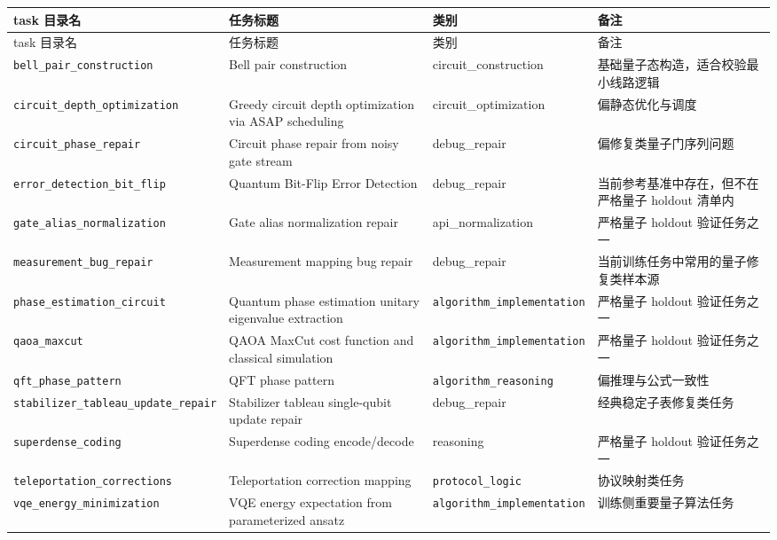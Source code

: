 \documentclass[11pt,a4paper]{article}
\newcommand{\code}[1]{\begingroup\ttfamily\footnotesize\nolinkurl{#1}\endgroup}
\begin{document}
\scriptsize
\begin{longtable}{T{2.9cm} p{3.7cm} T{3.6cm} p{3.5cm}}
\toprule
task 目录名 & 任务标题 & 类别 & 备注 \\
\midrule
\endfirsthead
\toprule
task 目录名 & 任务标题 & 类别 & 备注 \\
\midrule
\endhead
\code{bell_pair_construction} & Bell pair construction & circuit\_construction & 基础量子态构造，适合校验最小线路逻辑 \\
\code{circuit_depth_optimization} & Greedy circuit depth optimization via ASAP scheduling & circuit\_optimization & 偏静态优化与调度 \\
\code{circuit_phase_repair} & Circuit phase repair from noisy gate stream & debug\_repair & 偏修复类量子门序列问题 \\
\code{error_detection_bit_flip} & Quantum Bit-Flip Error Detection & debug\_repair & 当前参考基准中存在，但不在严格量子 holdout 清单内 \\
\code{gate_alias_normalization} & Gate alias normalization repair & api\_normalization & 严格量子 holdout 验证任务之一 \\
\code{measurement_bug_repair} & Measurement mapping bug repair & debug\_repair & 当前训练任务中常用的量子修复类样本源 \\
\code{phase_estimation_circuit} & Quantum phase estimation unitary eigenvalue extraction & \code{algorithm\_}\newline \code{implementation} & 严格量子 holdout 验证任务之一 \\
\code{qaoa_maxcut} & QAOA MaxCut cost function and classical simulation & \code{algorithm\_}\newline \code{implementation} & 严格量子 holdout 验证任务之一 \\
\code{qft_phase_pattern} & QFT phase pattern & \code{algorithm\_}\newline \code{reasoning} & 偏推理与公式一致性 \\
\code{stabilizer_tableau_update_repair} & Stabilizer tableau single-qubit update repair & debug\_repair & 经典稳定子表修复类任务 \\
\code{superdense_coding} & Superdense coding encode/decode & reasoning & 严格量子 holdout 验证任务之一 \\
\code{teleportation_corrections} & Teleportation correction mapping & \code{protocol\_logic} & 协议映射类任务 \\
\code{vqe_energy_minimization} & VQE energy expectation from parameterized ansatz & \code{algorithm\_}\newline \code{implementation} & 训练侧重要量子算法任务 \\
\bottomrule
\end{longtable}
\normalsize
\end{document}
